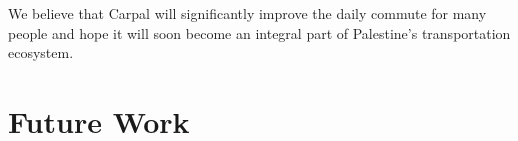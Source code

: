 \documentclass[a4paper, 12pt]{report} %
\begin{document}
        We believe that Carpal will significantly improve the daily commute for many people and hope it will soon become an integral part of Palestine's transportation ecosystem.
        
    \section{Future Work}



    \printbibliography
\end{document}
